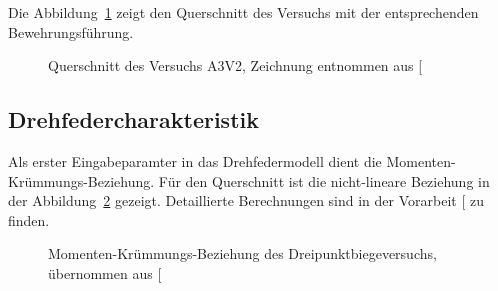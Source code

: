 \documentclass[
  11pt,
  letterpaper,
]{scrreprt}
\begin{document}
Die Abbildung~\ref{fig-qs_a3v2} zeigt den Querschnitt des Versuchs mit
der entsprechenden Bewehrungsführung.

\begin{figure}[H]


\caption{\label{fig-qs_a3v2}Querschnitt des Versuchs A3V2, Zeichnung
entnommen aus {[}\citeproc{ref-gitz_ansatze_2024}{1}{]}}

\end{figure}%

\subsection{Drehfedercharakteristik}\label{drehfedercharakteristik}

Als erster Eingabeparamter in das Drehfedermodell dient die
Momenten-Krümmungs-Beziehung. Für den Querschnitt ist die nicht-lineare
Beziehung in der Abbildung~\ref{fig-mchi_a3v2} gezeigt. Detaillierte
Berechnungen sind in der Vorarbeit
{[}\citeproc{ref-gitz_ansatze_2024}{1}{]} zu finden.

\begin{figure}[H]


\caption{\label{fig-mchi_a3v2}Momenten-Krümmungs-Beziehung des
Dreipunktbiegeversuchs, übernommen aus
{[}\citeproc{ref-gitz_ansatze_2024}{1}{]}}

\end{figure}%
\end{document}
